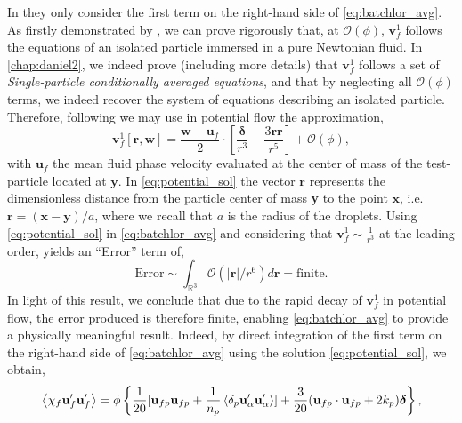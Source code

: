 In \citet{van1998pseudo} they only consider the first term on the right-hand side of \ref{eq:batchlor_avg}. 
As firstly demonstrated by \citet{hinch1977averaged}, we can prove rigorously that, at $\mathcal{O}(\phi)$, $\textbf{v}_f^1$ follows the equations of an isolated particle immersed in a pure Newtonian fluid. 
In \ref{chap:daniel2}, we indeed prove (including more details) that $\textbf{v}_f^{1}$ follows a set of \textit{Single-particle conditionally averaged equations}, and that by neglecting all $\mathcal{O}(\phi)$ terms, we indeed recover the system of equations describing an isolated particle. 
Therefore, following \citet{van1998pseudo,zhang1994averaged} we may use in potential flow the approximation, 
\begin{equation}
    \textbf{v}_f^{1}[\textbf{r},\textbf{w}]
    = 
    \frac{\textbf{w} - \textbf{u}_f}{2}\cdot \left[
        \frac{\bm\delta}{r^3}-\frac{3\textbf{rr}}{r^5}
    \right]
    + \mathcal{O}(\phi),
    \label{eq:potential_sol}
\end{equation}
with $\textbf{u}_f$ the mean fluid phase velocity evaluated at the center of mass of the test-particle located at $\textbf{y}$. 
In \ref{eq:potential_sol} the vector $\textbf{r}$ represents the dimensionless distance from the particle center of mass \textbf{y} to the point $\textbf{x}$, i.e. $\textbf{r} = (\textbf{x} - \textbf{y})/a$, where we recall that $a$ is the radius of the droplets. 
Using \ref{eq:potential_sol} in \ref{eq:batchlor_avg} and considering that $\textbf{v}_f^{1}\sim \frac{1}{r^3}$ at the leading order, yields an ``Error'' term of,  
\begin{equation*}
    \text{Error}
    \sim
    \int_{\mathbb{R}^3}
    \mathcal{O}(|\textbf{r}|/r^6)
    d\textbf{r}
    = \text{finite}. 
\end{equation*}
In light of this result, we conclude that due to the rapid decay of $\textbf{v}_f^{1}$ in potential flow, the error produced is therefore finite, enabling \ref{eq:batchlor_avg} to provide a physically meaningful result.
Indeed, by direct integration of the first term on the right-hand side of \ref{eq:batchlor_avg} using the solution \ref{eq:potential_sol}, we obtain, 
\begin{equation}
    \avg{\chi_f \textbf{u}_f'\textbf{u}_f'}
    = \phi \left\{
        \frac{1}{20}[\textbf{u}_{fp}\textbf{u}_{fp}+ \frac{1}{n_p}\pavg{\textbf{u}_\alpha'\textbf{u}_\alpha'}]
        + 
        \frac{3}{20} (\textbf{u}_{fp}\cdot \textbf{u}_{fp} + 2k_p)\bm\delta
    \right\},
    \label{eq:van_wingarden_sol}
\end{equation} 

